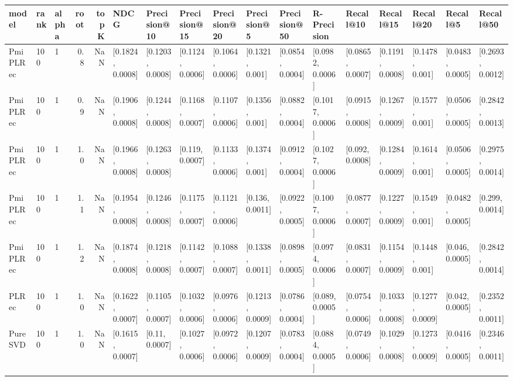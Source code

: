 \begin{tabular}{lllrrllllllllllll}
\toprule
     model & rank & alpha &  root &  topK &              NDCG &      Precision@10 &      Precision@15 &      Precision@20 &       Precision@5 &      Precision@50 &       R-Precision &         Recall@10 &         Recall@15 &         Recall@20 &          Recall@5 &         Recall@50 \\
\midrule
  PmiPLRec &  100 &     1 &   0.8 &   NaN &  [0.1824, 0.0008] &  [0.1203, 0.0008] &  [0.1124, 0.0006] &  [0.1064, 0.0006] &   [0.1321, 0.001] &  [0.0854, 0.0004] &  [0.0982, 0.0006] &  [0.0865, 0.0007] &  [0.1191, 0.0008] &   [0.1478, 0.001] &  [0.0483, 0.0005] &  [0.2693, 0.0012] \\
  PmiPLRec &  100 &     1 &   0.9 &   NaN &  [0.1906, 0.0008] &  [0.1244, 0.0008] &  [0.1168, 0.0007] &  [0.1107, 0.0006] &   [0.1356, 0.001] &  [0.0882, 0.0004] &  [0.1017, 0.0006] &  [0.0915, 0.0008] &  [0.1267, 0.0009] &   [0.1577, 0.001] &  [0.0506, 0.0005] &  [0.2842, 0.0013] \\
  PmiPLRec &  100 &     1 &   1.0 &   NaN &  [0.1966, 0.0008] &  [0.1263, 0.0008] &   [0.119, 0.0007] &  [0.1133, 0.0006] &   [0.1374, 0.001] &  [0.0912, 0.0004] &  [0.1027, 0.0006] &   [0.092, 0.0008] &  [0.1284, 0.0009] &   [0.1614, 0.001] &  [0.0506, 0.0005] &  [0.2975, 0.0014] \\
  PmiPLRec &  100 &     1 &   1.1 &   NaN &  [0.1954, 0.0008] &  [0.1246, 0.0008] &  [0.1175, 0.0007] &  [0.1121, 0.0006] &   [0.136, 0.0011] &  [0.0922, 0.0005] &  [0.1007, 0.0006] &  [0.0877, 0.0007] &  [0.1227, 0.0009] &   [0.1549, 0.001] &  [0.0482, 0.0005] &   [0.299, 0.0014] \\
  PmiPLRec &  100 &     1 &   1.2 &   NaN &  [0.1874, 0.0008] &  [0.1218, 0.0008] &  [0.1142, 0.0007] &  [0.1088, 0.0007] &  [0.1338, 0.0011] &  [0.0898, 0.0005] &  [0.0974, 0.0006] &  [0.0831, 0.0007] &  [0.1154, 0.0009] &   [0.1448, 0.001] &   [0.046, 0.0005] &  [0.2842, 0.0014] \\
     PLRec &  100 &     1 &   1.0 &   NaN &  [0.1622, 0.0007] &  [0.1105, 0.0007] &  [0.1032, 0.0006] &  [0.0976, 0.0006] &  [0.1213, 0.0009] &  [0.0786, 0.0004] &   [0.089, 0.0005] &  [0.0754, 0.0006] &  [0.1033, 0.0008] &  [0.1277, 0.0009] &   [0.042, 0.0005] &  [0.2352, 0.0011] \\
   PureSVD &  100 &     1 &   1.0 &   NaN &  [0.1615, 0.0007] &    [0.11, 0.0007] &  [0.1027, 0.0006] &  [0.0972, 0.0006] &  [0.1207, 0.0009] &  [0.0783, 0.0004] &  [0.0884, 0.0005] &  [0.0749, 0.0006] &  [0.1029, 0.0008] &  [0.1273, 0.0009] &  [0.0416, 0.0005] &  [0.2346, 0.0011] \\

\end{tabular}
